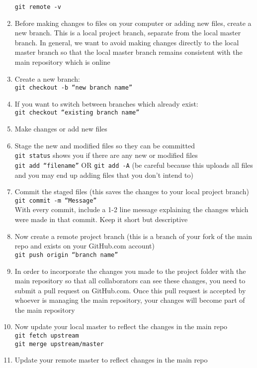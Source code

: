 \documentclass{article}
\begin{document}
\begin{enumerate}
	\texttt{git remote -v}
	\item Before making changes to files on your computer or adding new files, create a new branch. This is a local project branch, separate from the local master branch. In general, we want to avoid making changes directly to the local master branch so that the local master branch remains consistent with the main repository which is online
	\item Create a new branch: \\ 
	\texttt{git checkout -b ``new branch name''}
	\item If you want to switch between branches which already exist: \\
	\texttt{git checkout ``existing branch name''}
	\item Make changes or add new files
	\item Stage the new and modified files so they can be committed \\
	\texttt{git status} shows you if there are any new or modified files \\
	\texttt{git add ``filename''} OR \texttt{git add -A} (be careful because this uploads all files and you may end up adding files that you don’t intend to)
	\item Commit the staged files (this saves the changes to your local project branch) \\
	\texttt{git commit -m ``Message''} \\
	With every commit, include a 1-2 line message explaining the changes which were made in that commit. Keep it short but descriptive
	\item Now create a remote project branch (this is a branch of your fork of the main repo and exists on your GitHub.com account) \\
	\texttt{git push origin ``branch name''}
	\item In order to incorporate the changes you made to the project folder with the main repository so that all collaborators can see these changes, you need to submit a pull request on GitHub.com. Once this pull request is accepted by whoever is managing the main repository, your changes will become part of the main repository
	\item Now update your local master to reflect the changes in the main repo \\
	\texttt{git fetch upstream} \\
	\texttt{git merge upstream/master}
	\item Update your remote master to reflect changes in the main repo \\

\end{enumerate}
\end{document}
